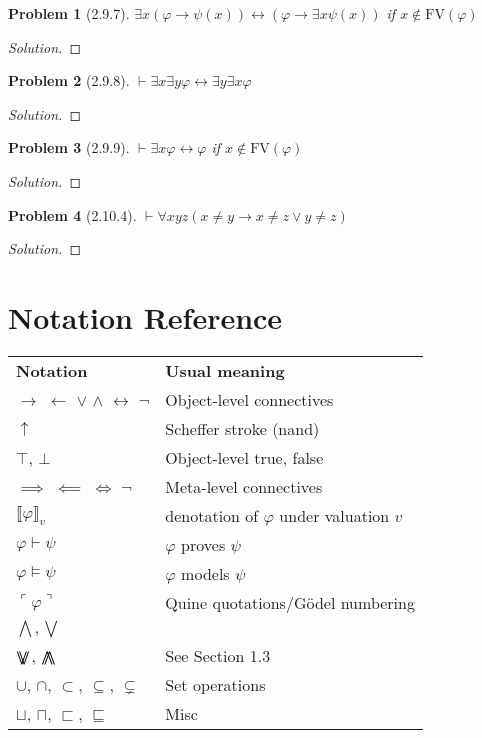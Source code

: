 \documentclass[letter]{article}
\newtheorem{problem}{Problem}
\theoremstyle{definition}
\newenvironment{solution}
{\begin{proof}[Solution]}
        {\end{proof}}
\renewcommand{\phi}{\varphi}
\DeclareMathOperator*{\bigdoublewedge}{\bigwedge\mkern-15mu\bigwedge}
\DeclareMathOperator*{\bigdoublevee}{\bigvee\mkern-15mu\bigvee}
\begin{document}
\begin{problem}[2.9.7]
    $\exists x(\phi \to \psi(x)) \leftrightarrow(\phi \to \exists x \psi(x))$ if $x \notin \textrm{FV}(\phi)$
\end{problem}
\begin{solution}
\end{solution}

\begin{problem}[2.9.8]
    $\vdash \exists x \exists y \phi \leftrightarrow \exists y \exists x \phi$
\end{problem}
\begin{solution}
\end{solution}

\begin{problem}[2.9.9]
    $\vdash \exists x \phi \leftrightarrow \phi$ if $x \notin \textrm{FV}(\phi)$
\end{problem}
\begin{solution}
\end{solution}

\begin{problem}[2.10.4]
    $\vdash \forall x y z (x \neq y \to x \neq z \lor y \neq z)$
\end{problem}
\begin{solution}
\end{solution}


\section{Notation Reference}
\begin{table}[H]
    \begin{tabular}{ll}
        \textbf{Notation} & \textbf{Usual meaning} \\
        $\to$ $\leftarrow$ $\lor$ $\land$ $\leftrightarrow$ $\neg$ & Object-level connectives \\
        $\uparrow$ & Scheffer stroke (nand)\\
        $\top$, $\bot$ & Object-level true, false \\
        $\implies$ $\impliedby$ $\iff$ $\neg$ & Meta-level connectives \\

        $\llbracket \phi \rrbracket_v$ & denotation of $\phi$ under valuation $v$\\
        $\phi \vdash \psi$ & $\phi$ proves $\psi$ \\
        $\phi \models \psi$ & $\phi$ models $\psi$ \\
        $\ulcorner \phi \urcorner$ & Quine quotations/G\"odel numbering \\
        $\bigwedge, \bigvee$ & \\
        $\bigdoublevee$, $\bigdoublewedge$ & See Section 1.3 \\
        $\cup$, $\cap$, $\subset$, $\subseteq$, $\subsetneq$ & Set operations \\
        $\sqcup$, $\sqcap$, $\sqsubset$, $\sqsubseteq$ & Misc \\
\end{tabular}
\end{table}
\end{document}
